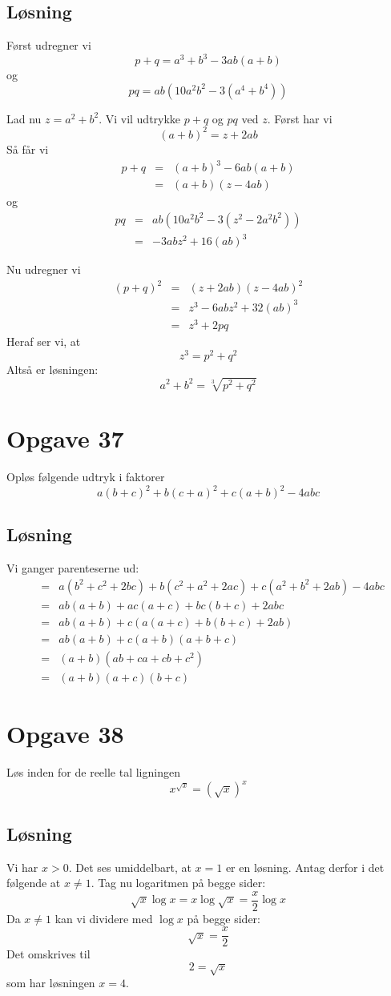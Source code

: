 \documentclass[12pt,oneside,a4paper]{article}
\newcommand{\bas}{\begin{eqnarray*}}
\newcommand{\eas}{\end{eqnarray*}}
\begin{document}
\subsection{Løsning}
Først udregner vi
$$
p+q = a^3+b^3-3ab(a+b)
$$
og
$$
pq = ab\left(10a^2b^2-3(a^4+b^4)\right)
$$

Lad nu $z=a^2+b^2$. Vi vil udtrykke $p+q$ og $pq$ ved $z$.
Først har vi
$$
(a+b)^2 = z + 2ab
$$
Så får vi
\bas
p+q &=& (a+b)^3-6ab(a+b) \\
    &=& (a+b)(z-4ab)
\eas
og
\bas
pq &=& ab(10a^2b^2-3(z^2-2a^2b^2)) \\
   &=& -3abz^2+16(ab)^3
\eas

Nu udregner vi
\bas
(p+q)^2 &=& (z+2ab) (z-4ab)^2 \\
        &=& z^3-6abz^2+32(ab)^3 \\
        &=& z^3+2pq
\eas
Heraf ser vi, at 
$$
z^3 = p^2+q^2
$$
Altså er løsningen:
$$
a^2+b^2 = \sqrt[3]{p^2+q^2}
$$

\section{Opgave 37}
Opløs følgende udtryk i faktorer
$$
a(b+c)^2+b(c+a)^2+c(a+b)^2-4abc
$$

\subsection{Løsning}
Vi ganger parenteserne ud:
\bas
&=& a(b^2+c^2+2bc) + b(c^2+a^2+2ac) + c(a^2+b^2+2ab)-4abc \\
&=& ab(a+b)+ac(a+c)+bc(b+c)+2abc \\
&=& ab(a+b) + c\left(a(a+c)+b(b+c)+2ab\right) \\
&=& ab(a+b) + c(a+b)(a+b+c) \\
&=& (a+b)(ab+ca+cb+c^2) \\
&=& (a+b)(a+c)(b+c)
\eas


\section{Opgave 38}
Løs inden for de reelle tal ligningen
$$
x^{\sqrt x} = \left(\sqrt x\right)^x
$$

\subsection{Løsning}
Vi har $x>0$. Det ses umiddelbart, at $x=1$ er en løsning. Antag derfor i det følgende at $x\neq 1$. Tag nu logaritmen på begge sider:
$$
\sqrt x \log x = x \log\sqrt x = \frac x2 \log x
$$
Da $x\neq 1$ kan vi dividere med $\log x$ på begge sider:
$$
\sqrt x = \frac x2
$$
Det omskrives til
$$
2 = \sqrt x
$$
som har løsningen $x=4$.
\end{document}
